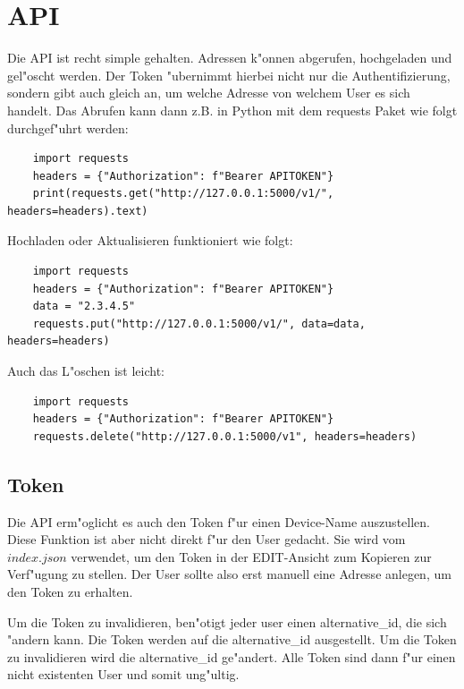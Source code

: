 \section{API}\label{sec:api_views}
Die API ist recht simple gehalten.
Adressen k{"o}nnen abgerufen, hochgeladen und gel{"o}scht werden.
Der Token {"u}bernimmt hierbei nicht nur die Authentifizierung, sondern gibt auch gleich an, um welche Adresse von welchem User es sich handelt.
Das Abrufen kann dann z.B. in Python mit dem requests Paket wie folgt durchgef{"u}hrt werden:

\vspace{3mm}
\begin{lstlisting}
    import requests
    headers = {"Authorization": f"Bearer APITOKEN"}
    print(requests.get("http://127.0.0.1:5000/v1/", headers=headers).text)
\end{lstlisting}
\vspace{3mm}

Hochladen oder Aktualisieren funktioniert wie folgt:
\vspace{3mm}
\begin{lstlisting}
    import requests
    headers = {"Authorization": f"Bearer APITOKEN"}
    data = "2.3.4.5"
    requests.put("http://127.0.0.1:5000/v1/", data=data, headers=headers)
\end{lstlisting}
\vspace{3mm}

Auch das L{"o}schen ist leicht:
\vspace{3mm}
\begin{lstlisting}
    import requests
    headers = {"Authorization": f"Bearer APITOKEN"}
    requests.delete("http://127.0.0.1:5000/v1", headers=headers)
\end{lstlisting}
\vspace{3mm}

\subsection{Token}\label{subsec:token}
Die API erm{"o}glicht es auch den Token f{"u}r einen Device-Name auszustellen.
Diese Funktion ist aber nicht direkt f{"u}r den User gedacht.
Sie wird vom $index.json$ verwendet, um den Token in der EDIT-Ansicht zum Kopieren zur Verf{"u}gung zu stellen.
Der User sollte also erst manuell eine Adresse anlegen, um den Token zu erhalten.

Um die Token zu invalidieren, ben{"o}tigt jeder user einen alternative\_id, die sich {"a}ndern kann.
Die Token werden auf die alternative\_id ausgestellt.
Um die Token zu invalidieren wird die alternative\_id ge{"a}ndert.
Alle Token sind dann f{"u}r einen nicht existenten User und somit ung{"u}ltig.

